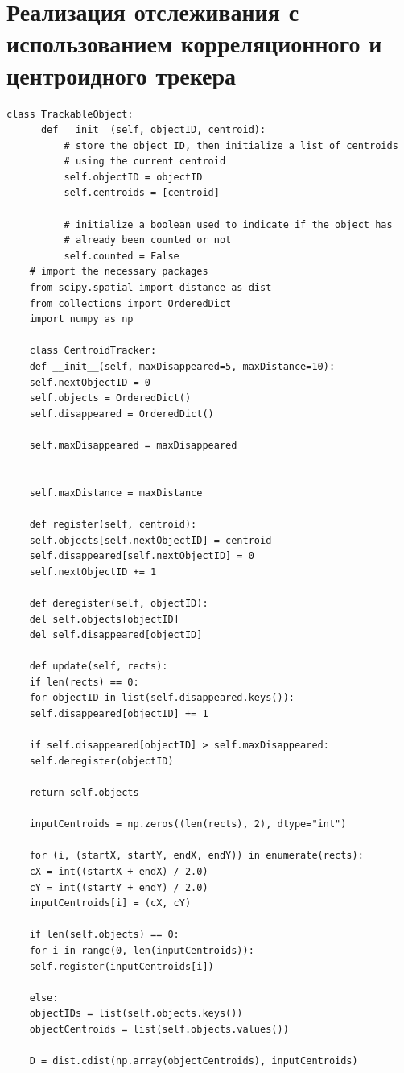 \documentclass[times]{itmo-student-thesis}
\begin{document}
    \chapter{Реализация отслеживания с использованием корреляционного и центроидного трекера}
  \begin{lstlisting}[caption={Корреляционный и центроидный трекер},label={lstX}]
  class TrackableObject:
	  def __init__(self, objectID, centroid):
		  # store the object ID, then initialize a list of centroids
		  # using the current centroid
		  self.objectID = objectID
		  self.centroids = [centroid]
		  
		  # initialize a boolean used to indicate if the object has
		  # already been counted or not
		  self.counted = False
	# import the necessary packages
	from scipy.spatial import distance as dist
	from collections import OrderedDict
	import numpy as np
	
	class CentroidTracker:
	def __init__(self, maxDisappeared=5, maxDistance=10):
	self.nextObjectID = 0
	self.objects = OrderedDict()
	self.disappeared = OrderedDict()
	
	self.maxDisappeared = maxDisappeared
	
	
	self.maxDistance = maxDistance
	
	def register(self, centroid):
	self.objects[self.nextObjectID] = centroid
	self.disappeared[self.nextObjectID] = 0
	self.nextObjectID += 1
	
	def deregister(self, objectID):
	del self.objects[objectID]
	del self.disappeared[objectID]
	
	def update(self, rects):
	if len(rects) == 0:
	for objectID in list(self.disappeared.keys()):
	self.disappeared[objectID] += 1
	
	if self.disappeared[objectID] > self.maxDisappeared:
	self.deregister(objectID)
	
	return self.objects
	
	inputCentroids = np.zeros((len(rects), 2), dtype="int")
	
	for (i, (startX, startY, endX, endY)) in enumerate(rects):
	cX = int((startX + endX) / 2.0)
	cY = int((startY + endY) / 2.0)
	inputCentroids[i] = (cX, cY)
	
	if len(self.objects) == 0:
	for i in range(0, len(inputCentroids)):
	self.register(inputCentroids[i])
	
	else:
	objectIDs = list(self.objects.keys())
	objectCentroids = list(self.objects.values())
	
	D = dist.cdist(np.array(objectCentroids), inputCentroids)
	

\end{lstlisting}
\end{document}
